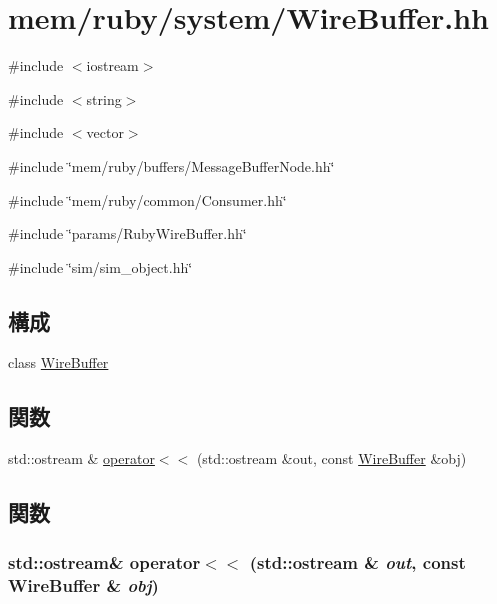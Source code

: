 \hypertarget{WireBuffer_8hh}{
\section{mem/ruby/system/WireBuffer.hh}
\label{WireBuffer_8hh}
}
{\ttfamily \#include $<$iostream$>$}\par
{\ttfamily \#include $<$string$>$}\par
{\ttfamily \#include $<$vector$>$}\par
{\ttfamily \#include \char`\"{}mem/ruby/buffers/MessageBufferNode.hh\char`\"{}}\par
{\ttfamily \#include \char`\"{}mem/ruby/common/Consumer.hh\char`\"{}}\par
{\ttfamily \#include \char`\"{}params/RubyWireBuffer.hh\char`\"{}}\par
{\ttfamily \#include \char`\"{}sim/sim\_\-object.hh\char`\"{}}\par
\subsection*{構成}
\begin{DoxyCompactItemize}
\item 
class \hyperlink{classWireBuffer}{WireBuffer}
\end{DoxyCompactItemize}
\subsection*{関数}
\begin{DoxyCompactItemize}
\item 
std::ostream \& \hyperlink{WireBuffer_8hh_a74e7a0650724a7b15155a12f4d1e9ad6}{operator$<$$<$} (std::ostream \&out, const \hyperlink{classWireBuffer}{WireBuffer} \&obj)
\end{DoxyCompactItemize}


\subsection{関数}
\hypertarget{WireBuffer_8hh_a74e7a0650724a7b15155a12f4d1e9ad6}{
\subsubsection[{operator$<$$<$}]{\setlength{\rightskip}{0pt plus 5cm}std::ostream\& operator$<$$<$ (std::ostream \& {\em out}, \/  const {\bf WireBuffer} \& {\em obj})}}
\label{WireBuffer_8hh_a74e7a0650724a7b15155a12f4d1e9ad6}
